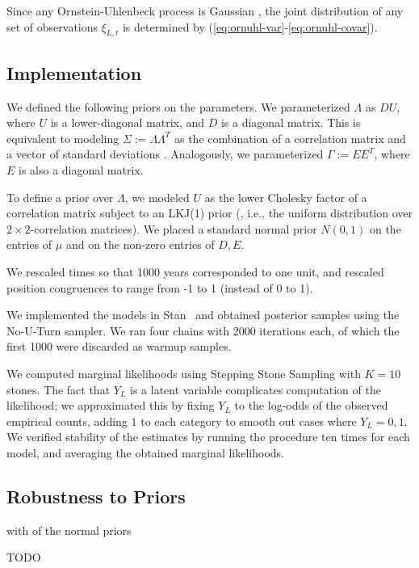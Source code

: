 \documentclass[11pt,a4paper]{article}
\begin{document}
Since any Ornstein-Uhlenbeck process is Gaussian \citep{schach1971weak}, the joint distribution of any set of observations $\xi_{L, t}$ is determined by (\ref{eq:ornuhl-var}-\ref{eq:ornuhl-covar}).

\subsection{Implementation}\label{sec:prior-lkj}

We defined the following priors on the parameters.
We parameterized $\Lambda$ as $D U$, where $U$ is a lower-diagonal matrix, and $D$ is a diagonal matrix.
This is equivalent to modeling $\Sigma := \Lambda\Lambda^T$ as the combination of a correlation matrix and a vector of standard deviations \citep{barnard2000modeling}.
Analogously, we parameterized $\Gamma := E E^T$, where $E$ is also a diagonal matrix.

To define a prior over $\Lambda$, we modeled $U$ as the lower Cholesky factor of a correlation matrix subject to an LKJ(1) prior (\citet{lewandowski2009generating}, i.e., the uniform distribution over $2\times 2$-correlation matrices).
We placed a standard normal prior $N(0,1)$ on the entries of $\mu$ and on the non-zero entries of $D, E$.

We rescaled times so that 1000 years corresponded to one unit, and rescaled position congruences to range from -1 to 1 (instead of 0 to 1).

We implemented the models in Stan~\citep{carpenter2017stan} and obtained posterior samples using the No-U-Turn sampler.
We ran four chains with 2000 iterations each, of which the first 1000 were discarded as warmup samples.

We computed marginal likelihoods using Stepping Stone Sampling \citep{xie2011improving} with $K=10$ stones.
The fact that $Y_L$ is a latent variable complicates computation of the likelihood; we approximated this by fixing $Y_L$ to the log-odds of the observed empirical counts, adding $1$ to each category to smooth out cases where $Y_L =0,1$.
We verified stability of the estimates by running the procedure ten times for each model, and averaging the obtained marginal likelihoods.

\subsection{Robustness to Priors}

with of the normal priors

TODO
\end{document}
